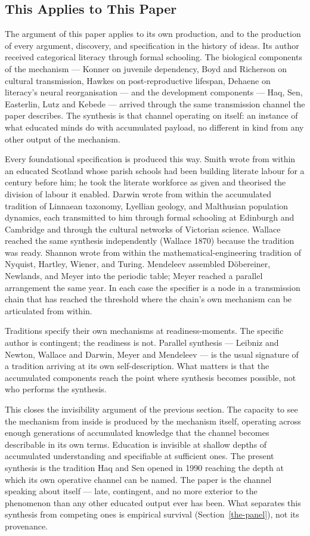 \documentclass[12pt,letterpaper]{article}
\begin{document}
\subsection{This Applies to This Paper}\label{this-applies-to-this-paper}

The argument of this paper applies to its own production, and to the
production of every argument, discovery, and specification in the
history of ideas. Its author received categorical literacy through
formal schooling. The biological components of the mechanism --- Konner
on juvenile dependency, Boyd and Richerson on cultural transmission,
Hawkes on post-reproductive lifespan, Dehaene on literacy's neural
reorganisation --- and the development components --- Haq, Sen,
Easterlin, Lutz and Kebede --- arrived through the same transmission
channel the paper describes. The synthesis is that channel operating on
itself: an instance of what educated minds do with accumulated payload,
no different in kind from any other output of the mechanism.

Every foundational specification is produced this way. Smith wrote from
within an educated Scotland whose parish schools had been building
literate labour for a century before him; he took the literate workforce
as given and theorised the division of labour it enabled. Darwin wrote
from within the accumulated tradition of Linnaean taxonomy, Lyellian
geology, and Malthusian population dynamics, each transmitted to him
through formal schooling at Edinburgh and Cambridge and through the
cultural networks of Victorian science. Wallace reached the same
synthesis independently (Wallace 1870) because the tradition was ready. Shannon wrote
from within the mathematical-engineering tradition of Nyquist, Hartley,
Wiener, and Turing. Mendeleev assembled Döbereiner, Newlands, and Meyer
into the periodic table; Meyer reached a parallel arrangement the same
year. In each case the specifier is a node in a transmission chain that
has reached the threshold where the chain's own mechanism can be
articulated from within.

Traditions specify their own mechanisms at readiness-moments. The
specific author is contingent; the readiness is not. Parallel synthesis
--- Leibniz and Newton, Wallace and Darwin, Meyer and Mendeleev --- is
the usual signature of a tradition arriving at its own self-description.
What matters is that the accumulated components reach the point where
synthesis becomes possible, not who performs the synthesis.

This closes the invisibility argument of the previous section. The
capacity to see the mechanism from inside is produced by the mechanism
itself, operating across enough generations of accumulated knowledge
that the channel becomes describable in its own terms. Education is
invisible at shallow depths of accumulated understanding and specifiable
at sufficient ones. The present synthesis is the tradition Haq and Sen
opened in 1990 reaching the depth at which its own operative channel
can be named. The paper is the channel speaking about itself --- late,
contingent, and no more exterior to the phenomenon than any other
educated output ever has been. What separates this synthesis from competing ones is empirical survival (Section~\ref{the-panel}), not its provenance.
\end{document}
